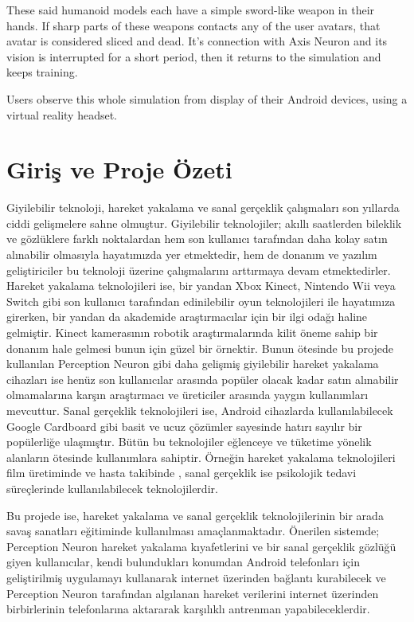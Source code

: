 \documentclass[a4paper, 12pt, titlepage]{article}
\begin{document}
These said humanoid models each have a simple sword-like weapon in their hands. If sharp parts of
these weapons contacts any of the user avatars, that avatar is considered sliced and dead. It’s
connection with Axis Neuron and its vision is interrupted for a short period, then it returns to
the simulation and keeps training.

Users observe this whole simulation from display of their Android devices, using a virtual reality
headset.

\newpage
\renewcommand*\contentsname{İçindekiler}
\tableofcontents
\newpage

\section{Giriş ve Proje Özeti}
Giyilebilir teknoloji, hareket yakalama ve sanal gerçeklik çalışmaları son yıllarda ciddi
gelişmelere sahne olmuştur. Giyilebilir teknolojiler; akıllı saatlerden bileklik ve gözlüklere
farklı noktalardan hem son kullanıcı tarafından daha kolay satın alınabilir olmasıyla hayatımızda
yer etmektedir, hem de donanım ve yazılım geliştiriciler bu teknoloji üzerine çalışmalarını
arttırmaya devam etmektedirler. Hareket yakalama teknolojileri ise, bir yandan Xbox Kinect,
Nintendo Wii veya Switch gibi son kullanıcı tarafından edinilebilir oyun teknolojileri ile
hayatımıza girerken, bir yandan da akademide araştırmacılar için bir ilgi odağı haline gelmiştir.
Kinect kamerasının robotik araştırmalarında kilit öneme sahip bir donanım hale gelmesi bunun için
güzel bir örnektir. Bunun ötesinde bu projede kullanılan Perception Neuron gibi daha gelişmiş
giyilebilir hareket yakalama cihazları ise henüz son kullanıcılar arasında popüler olacak kadar
satın alınabilir olmamalarına karşın araştırmacı ve üreticiler arasında yaygın kullanımları
mevcuttur. Sanal gerçeklik teknolojileri ise, Android cihazlarda kullanılabilecek Google Cardboard
gibi basit ve ucuz çözümler sayesinde hatırı sayılır bir popülerliğe ulaşmıştır. Bütün bu
teknolojiler eğlenceye ve tüketime yönelik alanların ötesinde kullanımlara sahiptir. Örneğin
hareket yakalama teknolojileri film üretiminde ve hasta takibinde \cite{edseee.660756620130101},
sanal gerçeklik ise psikolojik tedavi süreçlerinde \cite{edseee.743857520160101} kullanılabilecek
teknolojilerdir.

Bu projede ise, hareket yakalama ve sanal gerçeklik teknolojilerinin bir arada savaş sanatları
eğitiminde kullanılması amaçlanmaktadır. Önerilen sistemde; Perception Neuron hareket yakalama
kıyafetlerini ve bir sanal gerçeklik gözlüğü giyen kullanıcılar, kendi bulundukları konumdan
Android telefonları için geliştirilmiş uygulamayı kullanarak internet üzerinden bağlantı
kurabilecek ve Perception Neuron tarafından algılanan hareket verilerini internet üzerinden
birbirlerinin telefonlarına aktararak karşılıklı antrenman yapabileceklerdir.
\end{document}
